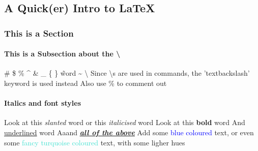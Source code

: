 \documentclass[12pt,twoside,a4paper]{article}
\begin{document}
\begin{center}
  \part*{A Quick(er) Intro to \LaTeX}
\end{center}

\section*{This is a Section}

\subsection*{This is a Subsection about the \textbackslash}

\# \$ \% \^{} \& \_ \{ \} \~word \~{} \textbackslash
\newline \newline Since \textbackslash s are used in commands, the 'textbackslash' keyword is used instead
\newline Also use \% to comment out %

\subsection*{Italics and font styles}
Look at this \textsl{slanted} word
\newline or this \textit{italicised} word %
\newline Look at this \textbf{bold} word \newline And \underline{underlined} word
\newline Aaand \textbf{\textit{\underline{all of the above}}}
\newline \newline Add some \textcolor{blue}{blue coloured} text, or even some
\textcolor{Turquoise}{fancy turquoise coloured} text, with some
\textcolor{TurquoiseLighter2}{ligher hues}
\newpage
\end{document}
